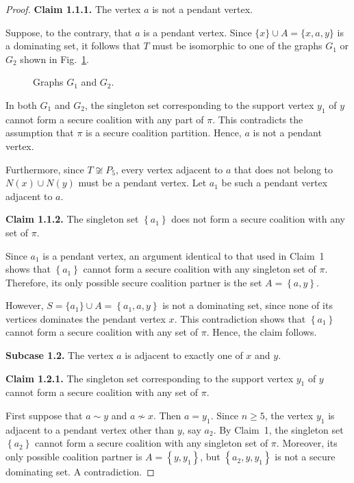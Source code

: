 \documentclass[10pt,a4paper]{amsart}
\begin{document}
\begin{proof}
\textbf{Claim 1.1.1.} The vertex $a$ is not a pendant vertex.

Suppose, to the contrary, that $a$ is a pendant vertex. Since $\{x\}\cup A=\{x,a,y\}$ is a dominating set, it follows that $T$ must be isomorphic to one of the graphs $G_1$ or $G_2$ shown in Fig.~\ref{figseccoalition}.

\begin{figure}[H]
\centering

\caption{Graphs $G_1$ and $G_2$.}
\label{figseccoalition}
\end{figure}

In both $G_1$ and $G_2$, the singleton set corresponding to the support vertex $y_1$ of $y$ cannot form a secure coalition with any part of $\pi$. This contradicts the assumption that $\pi$ is a secure coalition partition. Hence, $a$ is not a pendant vertex.

Furthermore, since $T\not\cong P_5$, every vertex adjacent to $a$ that does not belong to $N(x)\cup N(y)$ must be a pendant vertex. Let $a_1$ be such a pendant vertex adjacent to $a$.

\textbf{Claim 1.1.2.} The singleton set $\left\{a_1\right\}$ does not form a secure coalition with any set of $\pi$.

Since $a_1$ is a pendant vertex, an argument identical to that used in Claim~1 shows that $\left\{a_1\right\}$ cannot form a secure coalition with any singleton set of $\pi$. Therefore, its only possible secure coalition partner is the set $A=\left\{a,y\right\}$.

However, $S=\{a_1\}\cup A=\left\{a_1,a,y\right\}$
is not a dominating set, since none of its vertices dominates the pendant vertex $x$. This contradiction shows that $\left\{a_1\right\}$ cannot form a secure coalition with any set of $\pi$. Hence, the claim follows.

\textbf{Subcase 1.2.} The vertex $a$ is adjacent to exactly one of $x$ and $y$.

\textbf{Claim 1.2.1.} The singleton set corresponding to the support vertex $y_1$ of $y$ cannot form a secure coalition with any set of $\pi$.

First suppose that $a\sim y$ and $a\not\sim x$. Then $a=y_1$. Since $n\ge 5$, the vertex $y_1$ is adjacent to a pendant vertex other than $y$, say $a_2$. By Claim~1, the singleton set $\left\{a_2\right\}$ cannot form a secure coalition with any singleton set of $\pi$. Moreover, its only possible coalition partner is $A=\left\{y,y_1\right\}$, but $\left\{a_2,y,y_1\right\}$ is not a secure dominating set. A contradiction.


\end{proof}
\end{document}
